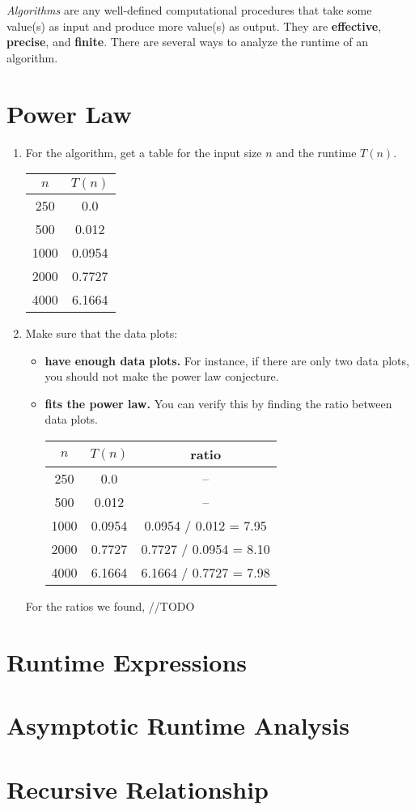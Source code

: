 
\textit{Algorithms} are any well-defined computational procedures that take some value(s) as input and produce more value(s) as output. They are \textbf{effective}, \textbf{precise}, and \textbf{finite}. There are several ways to analyze the runtime of an algorithm.

\section{Power Law}

\begin{enumerate}
  \item For the algorithm, get a table for the input size $n$ and the runtime $T(n)$.
    \begin{center}
      \begin{tabular}{ | c | c | } %
        \hline
        $n$ & $T(n)$ \\
        \hline
        250 & 0.0 \\
        500 & 0.012 \\
        1000 & 0.0954 \\
        2000 & 0.7727 \\
        4000 & 6.1664 \\
        \hline
      \end{tabular}
    \end{center}
  \item Make sure that the data plots:
    \begin{itemize}
      \item \textbf{have enough data plots.} For instance, if there are only two data plots, you should not make the power law conjecture.
      \item \textbf{fits the power law.} You can verify this by finding the ratio between data plots.
        \begin{center}
          \begin{tabular}{ | c | c | c | }
            \hline
            $n$ & $T(n)$ & ratio \\
            \hline
            250 & 0.0 & -- \\
            500 & 0.012 & -- \\
            1000 & 0.0954 & 0.0954 / 0.012 = 7.95 \\
            2000 & 0.7727 & 0.7727 / 0.0954 = 8.10 \\
            4000 & 6.1664 & 6.1664 / 0.7727 = 7.98 \\
            \hline
          \end{tabular}
        \end{center}
    \end{itemize}
    For the ratios we found, //TODO
\end{enumerate}

\section{Runtime Expressions}

\section{Asymptotic Runtime Analysis}

\section{Recursive Relationship}
